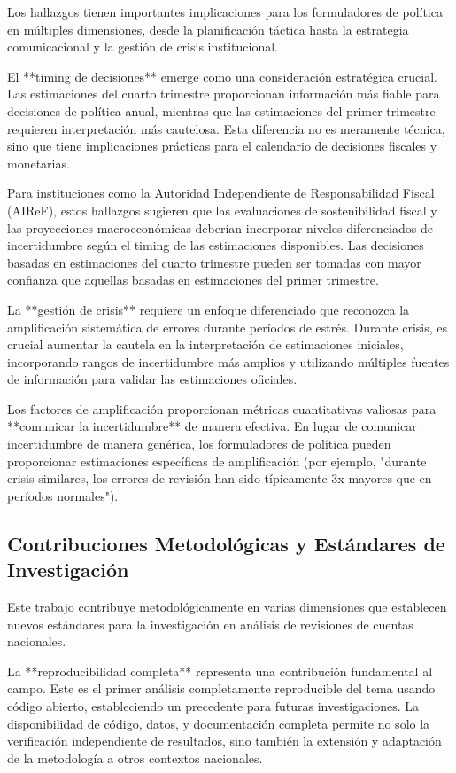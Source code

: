 \documentclass[12pt,a4paper]{article}
\begin{document}
Los hallazgos tienen importantes implicaciones para los formuladores de política en múltiples dimensiones, desde la planificación táctica hasta la estrategia comunicacional y la gestión de crisis institucional.

El **timing de decisiones** emerge como una consideración estratégica crucial. Las estimaciones del cuarto trimestre proporcionan información más fiable para decisiones de política anual, mientras que las estimaciones del primer trimestre requieren interpretación más cautelosa. Esta diferencia no es meramente técnica, sino que tiene implicaciones prácticas para el calendario de decisiones fiscales y monetarias.

Para instituciones como la Autoridad Independiente de Responsabilidad Fiscal (AIReF), estos hallazgos sugieren que las evaluaciones de sostenibilidad fiscal y las proyecciones macroeconómicas deberían incorporar niveles diferenciados de incertidumbre según el timing de las estimaciones disponibles. Las decisiones basadas en estimaciones del cuarto trimestre pueden ser tomadas con mayor confianza que aquellas basadas en estimaciones del primer trimestre.

La **gestión de crisis** requiere un enfoque diferenciado que reconozca la amplificación sistemática de errores durante períodos de estrés. Durante crisis, es crucial aumentar la cautela en la interpretación de estimaciones iniciales, incorporando rangos de incertidumbre más amplios y utilizando múltiples fuentes de información para validar las estimaciones oficiales.

Los factores de amplificación proporcionan métricas cuantitativas valiosas para **comunicar la incertidumbre** de manera efectiva. En lugar de comunicar incertidumbre de manera genérica, los formuladores de política pueden proporcionar estimaciones específicas de amplificación (por ejemplo, "durante crisis similares, los errores de revisión han sido típicamente 3x mayores que en períodos normales").

\subsection{Contribuciones Metodológicas y Estándares de Investigación}

Este trabajo contribuye metodológicamente en varias dimensiones que establecen nuevos estándares para la investigación en análisis de revisiones de cuentas nacionales.

La **reproducibilidad completa** representa una contribución fundamental al campo. Este es el primer análisis completamente reproducible del tema usando código abierto, estableciendo un precedente para futuras investigaciones. La disponibilidad de código, datos, y documentación completa permite no solo la verificación independiente de resultados, sino también la extensión y adaptación de la metodología a otros contextos nacionales.
\end{document}

